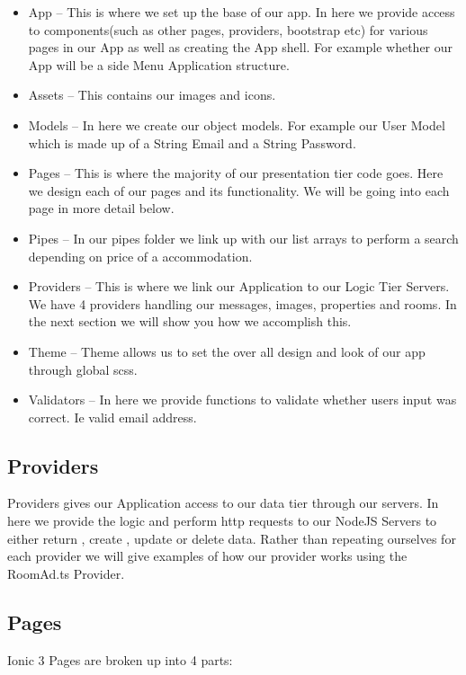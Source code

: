 \begin{itemize}
\item App – This is where we set up the base of our app. In here we provide access to components(such as other pages, providers, bootstrap etc) for various pages in our App as well as creating the App shell. For example whether our App will be a side Menu Application structure.
\item Assets – This contains our images and icons. 
\item Models – In here we create our object models. For example our User Model which is made up of a String Email and a String Password.
\item Pages – This is where the majority of our presentation tier code goes. Here we design each of our pages and its functionality. We will be going into each page in more detail below.
\item Pipes – In our pipes folder we link up with our list arrays to perform a search depending on price of a accommodation.
\item Providers – This is where we link our Application to our Logic Tier Servers. We have 4 providers handling our messages, images, properties and rooms. In the next section we will show you how we accomplish this.
\item Theme – Theme allows us to set the over all design and look of our app through global scss.
\item Validators – In here we provide functions to validate whether users input was correct. Ie valid email address.
\end{itemize}

\subsection{Providers}

Providers gives our Application access to our data tier through our servers. In here we provide the logic and perform http requests to our NodeJS Servers to either return , create , update or delete data. Rather than repeating ourselves for each provider we will give examples of how our provider works using the RoomAd.ts Provider.

\subsection{Pages}

Ionic 3 Pages are broken up into 4 parts:\\

